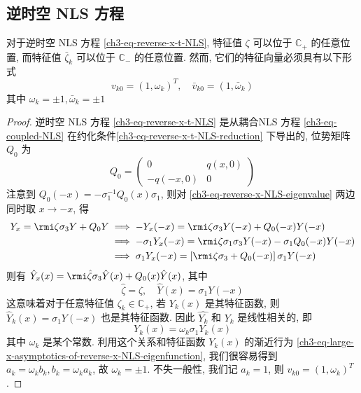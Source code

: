 \subsection{逆时空 NLS 方程}
\begin{theorem}\label{thm:NLS-inverse-x-t}
    对于逆时空 NLS 方程 \eqref{ch3-eq-reverse-x-t-NLS}, 特征值 $ \zeta $ 可以位于 $ \mathbb{C}_{+} $ 的任意位置, 而特征值 $ \bar{\zeta}_{k} $ 可以位于 $ \mathbb{C}_{-} $ 的任意位置. 然而, 它们的特征向量必须具有以下形式
    \begin{equation}
        v_{k0} = (1, \omega_{k})^{T}, \quad \bar{v}_{k0} = (1, \bar{\omega}_{k})
    \end{equation}
    其中 $ \omega_{k} = \pm 1, \bar{\omega}_{k} = \pm 1 $
\end{theorem}
\begin{proof}
    逆时空 NLS 方程 \eqref{ch3-eq-reverse-x-t-NLS} 是从耦合NLS 方程 \eqref{ch3-eq-coupled-NLS} 在约化条件\eqref{ch3-eq-reverse-x-t-NLS-reduction} 下导出的, 位势矩阵 $ Q_{0} $ 为
    \begin{equation}
        Q_{0} = \begin{pmatrix}
            0        & q(x,0) \\
            -q(-x,0) & 0
        \end{pmatrix}
    \end{equation}
    注意到 $ Q_{0}(-x) = -\sigma_{1}^{-1}Q_{0}(x)\sigma_{1} $, 则对 \eqref{ch3-eq-reverse-x-NLS-eigenvalue} 两边同时取 $ x \to -x $, 得
    \begin{equation}
        \begin{aligned}
            Y_{x} = \rmi \zeta \sigma_{3} Y + Q_{0}Y
             & \implies -Y_{x}(-x) = \rmi \zeta \sigma_{3} Y(-x) + Q_{0}(-x)Y(-x)                               \\
             & \implies -\sigma_{1} Y_{x}(-x)= \rmi \zeta \sigma_{1}\sigma_{3} Y(-x) - \sigma_{1}Q_{0}(-x)Y(-x) \\
             & \implies \sigma_{1}Y_{x}(-x) = \left[\rmi \zeta \sigma_{3} + Q_{0}(-x) \right]\sigma_{1}Y(-x)
        \end{aligned}
    \end{equation}
    则有 $ \hat{Y}_{x}(x) = \rmi \hat{\zeta}  \sigma_{3} \hat{Y}(x) + Q_{0}(x)\hat{Y}(x) $, 其中
    \begin{equation}
        \hat{\zeta} = \zeta, \quad \hat{Y}(x) = \sigma_{1}Y(-x) \label{ch3-eq-reverse-x-t-NLS-eigenvector}
    \end{equation}
    这意味着对于任意特征值 $ \zeta_{k} \in \mathbb{C}_{+} $, 若 $ Y_{k}(x) $ 是其特征函数, 则 $ \hat{Y}_{k}(x) = \sigma_{1} Y(-x) $ 也是其特征函数. 因此 $ \hat{Y_{k}} $ 和 $ Y_{k} $ 是线性相关的, 即
    \begin{equation}
        Y_{k}(x) = \omega_{k}\sigma_{1}Y_{k}(x)
    \end{equation}
    其中 $ \omega_{k} $ 是某个常数. 利用这个关系和特征函数 $ Y_{k}(x) $ 的渐近行为 \eqref{ch3-eq-large-x-asymptotics-of-reverse-x-NLS-eigenfunction}, 我们很容易得到 $ a_{k} = \omega_{k} b_{k}, b_{k} = \omega_{k} a_{k} $, 故 $ \omega_{k} = \pm 1 $. 不失一般性, 我们记 $ a_{k} = 1$, 则 $ v_{k0} = (1, \omega_{k})^{T} $.
\end{proof}

